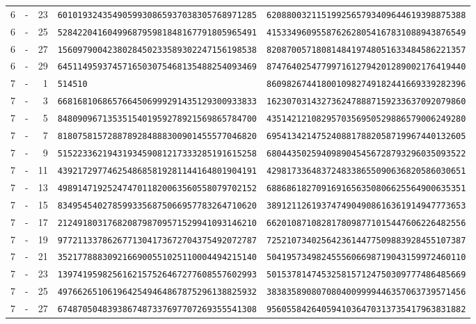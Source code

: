 \begin{longtable}{@{}rcrll@{}}
6&-&23&\texttt{6010193243549059930865937038305768971285}&\texttt{6208800321151992565793409644619398875388}\\
6&-&25&\texttt{5284220416049968795981848167791805965491}&\texttt{4153349609558762628054167831088943876549}\\
6&-&27&\texttt{1560979004238028450233589302247156198538}&\texttt{8208700571808148419748051633484586221357}\\
6&-&29&\texttt{6451149593745716503075468135488254093469}&\texttt{8747640254779971612794201289002176419440}\\
7&-&1&\texttt{514510}&\texttt{8609826744180010982749182441669339282396}\\
7&-&3&\texttt{6681681068657664506999291435129300933833}&\texttt{1623070314327362478887159233637092079860}\\
7&-&5&\texttt{8480909671353515401959278921569865784700}&\texttt{4351421210829570356950529886579006249280}\\
7&-&7&\texttt{8180758157288789284888300901455577046820}&\texttt{6954134214752408817882058719967440132605}\\
7&-&9&\texttt{5152233621943193459081217333285191615258}&\texttt{6804435025940989045456728793296035093522}\\
7&-&11&\texttt{4392172977462548685819281144164801904191}&\texttt{4298173364837248338655090636820586030651}\\
7&-&13&\texttt{4989147192524747011820063560558079702152}&\texttt{6886861827091691656350806625564900635351}\\
7&-&15&\texttt{8349545402785993356875066957783264710620}&\texttt{3891211261937474904908616361914947773653}\\
7&-&17&\texttt{2124918031768208798709571529941093146210}&\texttt{6620108710828178098771015447606226482556}\\
7&-&19&\texttt{9772113378626771304173672704375492072787}&\texttt{7252107340256423614477509883928455107387}\\
7&-&21&\texttt{3521778883092166900551025110004494215140}&\texttt{5041957349824555606698719043159972460110}\\
7&-&23&\texttt{1397419598256162157526467277608557602993}&\texttt{5015378147453258157124750309777486485669}\\
7&-&25&\texttt{4976626510619642549464867875296138825932}&\texttt{3838358908070804009999446357063739571456}\\
7&-&27&\texttt{6748705048393867487337697707269355541308}&\texttt{9560558426405941036470313735417963831882}\\

\end{longtable}
